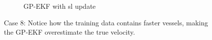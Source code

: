 \begin{figure}
    \begin{subfigure}{\textwidth}
        \caption{GP-EKF with \acrshort{sl} update}
    \end{subfigure}
    \caption{Case 8: Notice how the training data contains faster vessels, making the GP-EKF overestimate the true velocity.}
\end{figure}
